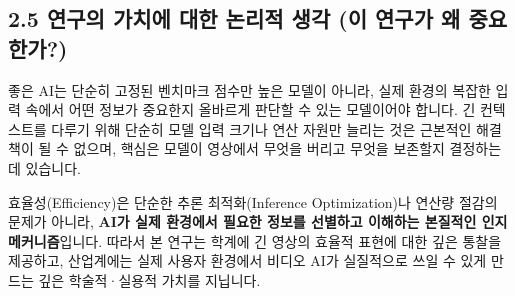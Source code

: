 \documentclass[10pt, a4paper, twocolumn]{article}
\begin{document}
\subsection{2.5 연구의 가치에 대한 논리적 생각 (이 연구가 왜 중요한가?)}
좋은 AI는 단순히 고정된 벤치마크 점수만 높은 모델이 아니라, 실제 환경의 복잡한 입력 속에서 어떤 정보가 중요한지 올바르게 판단할 수 있는 모델이어야 합니다. 긴 컨텍스트를 다루기 위해 단순히 모델 입력 크기나 연산 자원만 늘리는 것은 근본적인 해결책이 될 수 없으며, 핵심은 모델이 영상에서 무엇을 버리고 무엇을 보존할지 결정하는 데 있습니다.

효율성(Efficiency)은 단순한 추론 최적화(Inference Optimization)나 연산량 절감의 문제가 아니라, \textbf{AI가 실제 환경에서 필요한 정보를 선별하고 이해하는 본질적인 인지 메커니즘}입니다. 따라서 본 연구는 학계에 긴 영상의 효율적 표현에 대한 깊은 통찰을 제공하고, 산업계에는 실제 사용자 환경에서 비디오 AI가 실질적으로 쓰일 수 있게 만드는 깊은 학술적·실용적 가치를 지닙니다.
\end{document}
